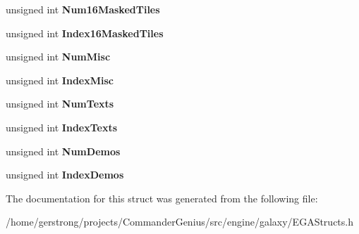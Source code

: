 \begin{DoxyCompactItemize}
\item 
\hypertarget{struct_episode_info_struct_a57f95d97ea436a2a046450bb1b6fb5d5}{
unsigned int {\bfseries Num16MaskedTiles}}
\label{struct_episode_info_struct_a57f95d97ea436a2a046450bb1b6fb5d5}

\item 
\hypertarget{struct_episode_info_struct_a2f243f9b19384f64420a37c030f5b8f3}{
unsigned int {\bfseries Index16MaskedTiles}}
\label{struct_episode_info_struct_a2f243f9b19384f64420a37c030f5b8f3}

\item 
\hypertarget{struct_episode_info_struct_ab5bfb99b83a00fcc6435b2be55aa17ed}{
unsigned int {\bfseries NumMisc}}
\label{struct_episode_info_struct_ab5bfb99b83a00fcc6435b2be55aa17ed}

\item 
\hypertarget{struct_episode_info_struct_ac22381c5203bb6bb9bd8ad7c6cf31922}{
unsigned int {\bfseries IndexMisc}}
\label{struct_episode_info_struct_ac22381c5203bb6bb9bd8ad7c6cf31922}

\item 
\hypertarget{struct_episode_info_struct_ab6ace4a27700469c7422c000200321a8}{
unsigned int {\bfseries NumTexts}}
\label{struct_episode_info_struct_ab6ace4a27700469c7422c000200321a8}

\item 
\hypertarget{struct_episode_info_struct_a76d1dc1e180c620f1669d50dd43c18d1}{
unsigned int {\bfseries IndexTexts}}
\label{struct_episode_info_struct_a76d1dc1e180c620f1669d50dd43c18d1}

\item 
\hypertarget{struct_episode_info_struct_a835f49a8e8f50e35cec8f5ac88ad0a92}{
unsigned int {\bfseries NumDemos}}
\label{struct_episode_info_struct_a835f49a8e8f50e35cec8f5ac88ad0a92}

\item 
\hypertarget{struct_episode_info_struct_af5f8ba92c5db7e876bc10ecb28ca1cb3}{
unsigned int {\bfseries IndexDemos}}
\label{struct_episode_info_struct_af5f8ba92c5db7e876bc10ecb28ca1cb3}

\end{DoxyCompactItemize}


The documentation for this struct was generated from the following file:\begin{DoxyCompactItemize}
\item 
/home/gerstrong/projects/CommanderGenius/src/engine/galaxy/EGAStructs.h\end{DoxyCompactItemize}
